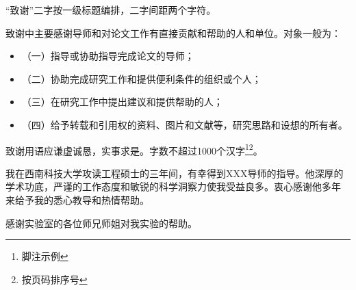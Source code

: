 \begin{acknowledgements}

“致谢”二字按一级标题编排，二字间距两个字符。

致谢中主要感谢导师和对论文工作有直接贡献和帮助的人和单位。对象一般为：
\begin{itemize}[label={}, leftmargin=0pt]
  \item（一）指导或协助指导完成论文的导师；
  \item（二）协助完成研究工作和提供便利条件的组织或个人；
  \item（三）在研究工作中提出建议和提供帮助的人；
  \item（四）给予转载和引用权的资料、图片和文献等，研究思路和设想的所有者。
\end{itemize}

致谢用语应谦虚诚恳，实事求是。字数不超过1000个汉字\footnote{脚注示例}\footnote{按页码排序号}。

我在西南科技大学攻读工程硕士的三年间，有幸得到XXX导师的指导。他深厚的
学术功底，严谨的工作态度和敏锐的科学洞察力使我受益良多。衷心感谢他多年
来给予我的悉心教导和热情帮助。

感谢实验室的各位师兄师姐对我实验的帮助。

\end{acknowledgements}
